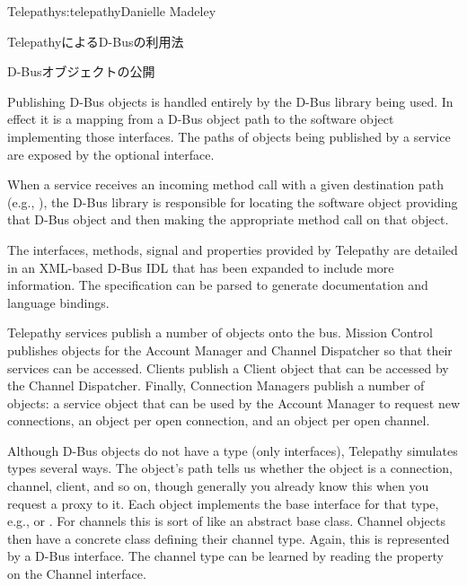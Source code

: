 \begin{aosachapter}{Telepathy}{s:telepathy}{Danielle Madeley}
\begin{aosasect1}{TelepathyによるD-Busの利用法}

\begin{aosabox}{D-Busオブジェクトの公開}

Publishing D-Bus objects is handled entirely by the D-Bus library
being used. In effect it is a mapping from a D-Bus object path to the
software object implementing those interfaces.  The paths of objects
being published by a service are exposed by the optional
 interface.

When a service receives an incoming method call with a given
destination path (e.g., ), the D-Bus
library is responsible for locating the software object providing that
D-Bus object and then making the appropriate method call on that
object.

\end{aosabox}

The interfaces, methods, signal and properties provided by Telepathy
are detailed in an XML-based D-Bus IDL that has been expanded to
include more information.  The specification can be parsed to generate
documentation and language bindings.

Telepathy services publish a number of objects onto the bus. Mission
Control publishes objects for the Account Manager and Channel
Dispatcher so that their services can be accessed. Clients publish a
Client object that can be accessed by the Channel Dispatcher. Finally,
Connection Managers publish a number of objects: a service object that
can be used by the Account Manager to request new connections, an
object per open connection, and an object per open channel.

Although D-Bus objects do not have a type (only interfaces), Telepathy
simulates types several ways. The object's path tells us whether the
object is a connection, channel, client, and so on, though generally
you already know this when you request a proxy to it. Each object
implements the base interface for that type, e.g.,
 or .  For channels this is
sort of like an abstract base class.  Channel objects then have a
concrete class defining their channel type.  Again, this is
represented by a D-Bus interface. The channel type can be learned by
reading the  property on the Channel interface.


\end{aosasect1}
\end{aosachapter}
